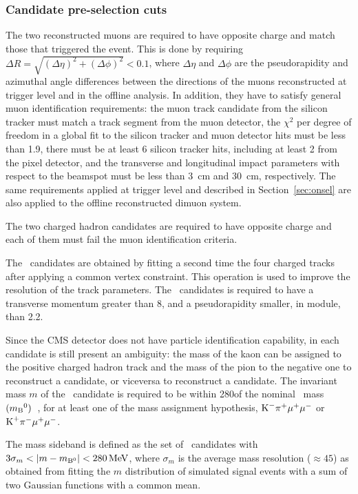 \subsubsection{Candidate pre-selection cuts}

The two reconstructed muons are required to have opposite charge and match those that triggered the event.
This is done by requiring $\Delta R = \sqrt{(\Delta\eta)^2+(\Delta\phi)^2}<0.1$, where $\Delta\eta$ and $\Delta\phi$ are the pseudorapidity and azimuthal angle differences between the directions of the muons reconstructed at trigger level and in the offline analysis.
In addition, they have to satisfy general muon identification requirements: the muon track candidate from the silicon  tracker must match a track segment from the muon detector, the $\chi^2$ per degree of freedom in a global fit to the silicon tracker and muon detector hits must be less than 1.9, there must be at least 6 silicon tracker hits, including at least 2 from the pixel detector, and the transverse and longitudinal impact parameters with respect to the beamspot must be less than \SI{3}{\centi\metre} and \SI{30}{\centi\metre}, respectively.
The same requirements applied at trigger level and described in Section~\ref{sec:onsel} are also applied to the offline reconstructed dimuon system.

The two charged hadron candidates are required to have opposite charge and each of them must fail the muon identification criteria.

The \PBz\ candidates are obtained by fitting a second time the four charged tracks after applying a common vertex constraint.
This operation is used to improve the resolution of the track parameters.
The \PBz\ candidates is required to have a transverse momentum greater than 8\GeV, and a pseudorapidity smaller, in module, than 2.2.

Since the CMS detector does not have particle identification capability, in each candidate is still present an ambiguity: the mass of the kaon can be assigned to the positive charged hadron track and the mass of the pion to the negative one to reconstruct a \cPKstz candidate, or viceversa to reconstruct a \cPAKstz candidate.
The invariant mass $m$ of the \PBz\ candidate is required to be within 280\MeV of the nominal \PBz\ mass $(m_{\textrm{B}}{}^{0})$~\cite{PDG}, for at least one of the mass assignment hypothesis, $\textrm{K}^{-}\pi^{+}\mu^{+}\mu^{-}$ or $\textrm{K}^{+}\pi^{-}\mu^{+}\mu^{-}$.

The mass sideband is defined as the set of \PBz\ candidates with $3\sigma_m < \lvert m-m_{{\textrm{B}}{}^{0}}\rvert < 280\,\textrm{MeV}$, where $\sigma_m$ is the average mass resolution (${\approx}45$\MeV) as obtained from fitting the $m$ distribution of simulated signal events with a sum of two Gaussian functions with a common mean.



